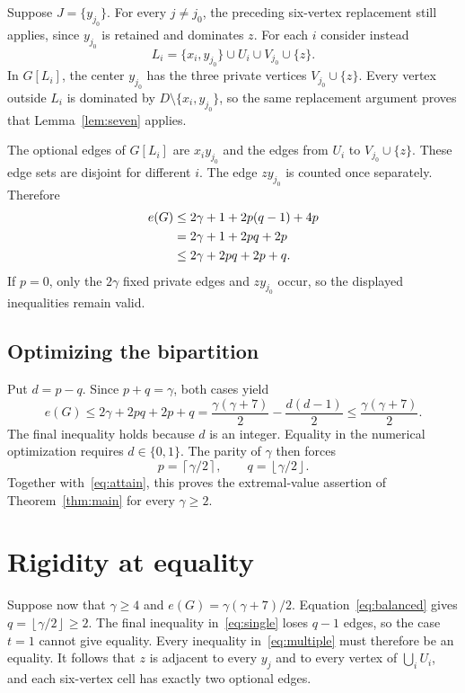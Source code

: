 \documentclass[11pt]{article}
\theoremstyle{definition}
\theoremstyle{remark}
\newcommand{\e}{e}
\newcommand{\ceil}[1]{\left\lceil#1\right\rceil}
\newcommand{\floor}[1]{\left\lfloor#1\right\rfloor}
\begin{document}
Suppose $J=\{y_{j_0}\}$. For every $j\ne j_0$, the preceding six-vertex
replacement still applies, since $y_{j_0}$ is retained and dominates $z$.
For each $i$ consider instead
\[
 L_i=\{x_i,y_{j_0}\}\cup U_i\cup V_{j_0}\cup\{z\}.
\]
In $G[L_i]$, the center $y_{j_0}$ has the three private vertices
$V_{j_0}\cup\{z\}$. Every vertex outside $L_i$ is dominated by
$D\setminus\{x_i,y_{j_0}\}$, so the same replacement argument proves that
Lemma~\ref{lem:seven} applies.

The optional edges of $G[L_i]$ are $x_i y_{j_0}$ and the edges from $U_i$
to $V_{j_0}\cup\{z\}$. These edge sets are disjoint for different $i$.
The edge $zy_{j_0}$ is counted once separately. Therefore
\begin{align}
 \e(G)&\le 2\gamma+1+2p(q-1)+4p\notag\\
       &=2\gamma+1+2pq+2p\notag\\
       &\le2\gamma+2pq+2p+q.\label{eq:single}
\end{align}
If $p=0$, only the $2\gamma$ fixed private edges and $zy_{j_0}$ occur,
so the displayed inequalities remain valid.

\subsection{Optimizing the bipartition}

Put $d=p-q$. Since $p+q=\gamma$, both cases yield
\begin{equation}\label{eq:opt}
 \e(G)\le 2\gamma+2pq+2p+q
 =\frac{\gamma(\gamma+7)}2-\frac{d(d-1)}2
 \le\frac{\gamma(\gamma+7)}2.
\end{equation}
The final inequality holds because $d$ is an integer. Equality in the
numerical optimization requires $d\in\{0,1\}$. The parity of $\gamma$
then forces
\begin{equation}\label{eq:balanced}
 p=\ceil{\gamma/2},\qquad q=\floor{\gamma/2}.
\end{equation}
Together with~\eqref{eq:attain}, this proves the extremal-value assertion of
Theorem~\ref{thm:main} for every $\gamma\ge2$.

\section{Rigidity at equality}\label{sec:rigidity}

Suppose now that $\gamma\ge4$ and
$\e(G)=\gamma(\gamma+7)/2$. Equation~\eqref{eq:balanced} gives
$q=\floor{\gamma/2}\ge2$. The final inequality in~\eqref{eq:single}
loses $q-1$ edges, so the case $t=1$ cannot give equality.
Every inequality in~\eqref{eq:multiple} must therefore be an equality.
It follows that $z$ is adjacent to every $y_j$ and to every vertex of
$\bigcup_iU_i$, and each six-vertex cell has exactly two optional edges.
\end{document}

